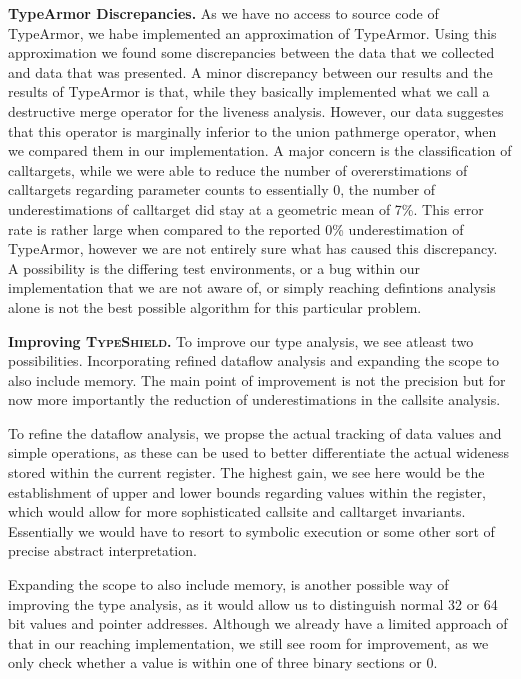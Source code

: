 \textbf{TypeArmor Discrepancies.}
\label{section:discrep}
As we have no access to source code of TypeArmor, we habe implemented an approximation
of TypeArmor. Using this approximation we found some discrepancies between the data that we collected
and data that was presented.
A minor discrepancy between our results and the results of TypeArmor is that, while they basically implemented
what we call a destructive merge operator for the liveness analysis. However, our data suggestes that this
operator is marginally inferior to the union pathmerge operator, when we compared them in our implementation.
A major concern is the classification of calltargets, while we were able to reduce the number of overerstimations
of calltargets regarding parameter counts to essentially 0, the number of underestimations of calltarget did
stay at a geometric mean of 7\%. This error rate is rather large when compared to the reported 0\% underestimation
of TypeArmor, however we are not entirely sure what has caused this discrepancy. A possibility is the differing
test environments, or a bug within our implementation that we are not aware of, or simply reaching defintions
analysis alone is not the best possible algorithm for this particular problem.

\textbf{Improving \textsc{TypeShield}.}
\label{section:venuesimp}
To improve our type analysis, we see atleast two possibilities. Incorporating refined dataflow analysis and 
expanding the scope to also include memory. The main point of improvement is not the precision but for now 
more importantly the reduction of underestimations in the callsite analysis.

To refine the dataflow analysis, we propse the actual tracking of data values and simple operations, as these
can be used to better differentiate the actual wideness stored within the current register. The highest gain, 
we see here would be the establishment of upper and lower bounds regarding values within the register, which 
would allow for more sophisticated callsite and calltarget invariants. Essentially we would have to resort 
to symbolic execution or some other sort of precise abstract interpretation.

Expanding the scope to also include memory, is another possible way of improving the type analysis, as it 
would allow us to distinguish normal 32 or 64 bit values and pointer addresses. Although we already have a 
limited approach of that in our reaching implementation, we still see room for improvement, as we only check
whether a value is within one of three binary sections or 0.


